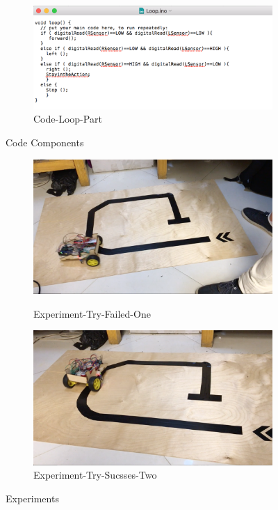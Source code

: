 \documentclass[11pt]{report}
\begin{document}
\begin{figure}[]
\begin{subfigure}[normal]{0.5\textwidth}
						\includegraphics[scale=0.3]{Ch4-Executing/Code-Loop-Part}
						\caption{Code-Loop-Part}
						\label{subfiger:c}
						
						
					\end{subfigure}
					\caption{Code Components}
			
		\end{figure}
		
		\begin{figure}[ht]
				\begin{subfigure}[normal]{0.5\textwidth}
					\includegraphics[scale=0.15]{Ch4-Executing/Experiment-Try-One}
					\caption{Experiment-Try-Failed-One}
					\label{A}
			
					\includegraphics[scale=0.15]{Ch4-Executing/Experiment-Try-Two}
					\caption{Experiment-Try-Sucsses-Two}
					\label{B}
					
				\end{subfigure}
				\caption{Experiments}
		\end{figure}
	\newpage
	\newpage
	\newpage
	\newpage
\end{document}
